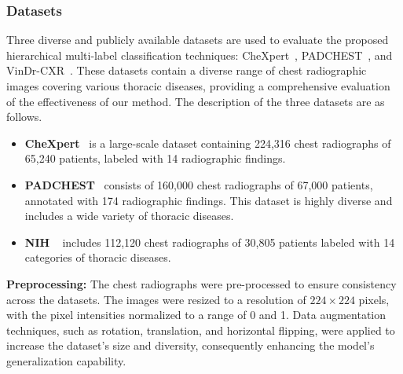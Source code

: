 \subsubsection{Datasets}
Three diverse and publicly available datasets are used  to evaluate the proposed hierarchical multi-label classification techniques: CheXpert~\cite{irvin_CheXpert_2019}, PADCHEST~\cite{bustos_Padchest_2020}, and VinDr-CXR~\cite{nguyen_VinDrCXR_2022}. These datasets contain a diverse range of chest radiographic images covering various thoracic diseases, providing a comprehensive evaluation of the effectiveness of our method. The description of the three datasets are as follows.
\begin{itemize}
    \item  \textbf{CheXpert}~\cite{irvin_CheXpert_2019} is a large-scale dataset containing 224,316 chest radiographs of 65,240 patients, labeled with 14 radiographic findings.
    \item \textbf{PADCHEST}~\cite{bustos_Padchest_2020} consists of 160,000 chest radiographs of 67,000 patients, annotated with 174 radiographic findings. This dataset is highly diverse and includes a wide variety of thoracic diseases.
    \item \textbf{NIH }~\cite{wang_ChestXRay8_2017} includes 112,120 chest radiographs of 30,805 patients labeled with 14 categories of thoracic diseases.
\end{itemize}
\textbf{Preprocessing: } The chest radiographs were pre-processed to ensure consistency across the datasets. The images were resized to a resolution of $224 \times 224$ pixels, with the pixel intensities normalized to a range of 0 and 1. Data augmentation techniques, such as rotation, translation, and horizontal flipping, were applied to increase the dataset's size and diversity, consequently enhancing the model's generalization capability.
